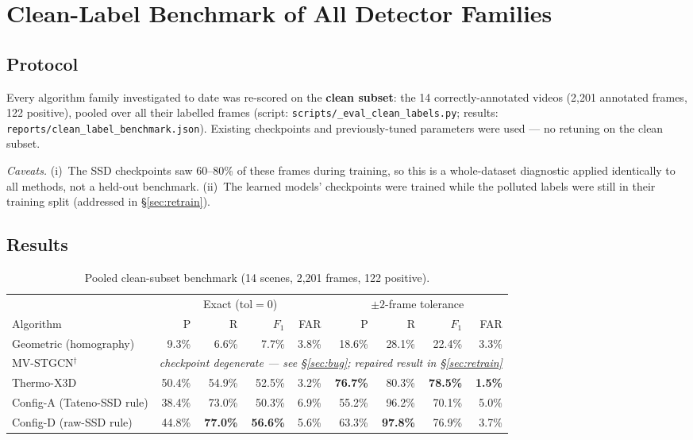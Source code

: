 \documentclass[11pt, a4paper]{article}
\begin{document}
\section{Clean-Label Benchmark of All Detector Families}

\subsection{Protocol}

Every algorithm family investigated to date was re-scored on the \textbf{clean subset}:
the 14 correctly-annotated videos (2{,}201 annotated frames, 122 positive), pooled over
all their labelled frames (script: \texttt{scripts/\_eval\_clean\_labels.py}; results:
\texttt{reports/clean\_label\_benchmark.json}). Existing checkpoints and previously-tuned
parameters were used --- no retuning on the clean subset.

\emph{Caveats.} (i)~The SSD checkpoints saw 60--80\% of these frames during training, so
this is a whole-dataset diagnostic applied identically to all methods, not a held-out
benchmark. (ii)~The learned models' checkpoints were trained while the polluted labels
were still in their training split (addressed in \S\ref{sec:retrain}).

\subsection{Results}

\begin{table}[H]
\centering
\small
\begin{tabular}{lrrrrrrrr}
\toprule
 & \multicolumn{4}{c}{Exact (tol$=0$)} & \multicolumn{4}{c}{$\pm2$-frame tolerance} \\
\cmidrule(lr){2-5}\cmidrule(lr){6-9}
Algorithm & P & R & $F_1$ & FAR & P & R & $F_1$ & FAR \\
\midrule
Geometric (homography)      &  9.3\% &  6.6\% &  7.7\% & 3.8\% & 18.6\% & 28.1\% & 22.4\% & 3.3\% \\
MV-STGCN$^{\dagger}$        & \multicolumn{8}{c}{\emph{checkpoint degenerate --- see \S\ref{sec:bug}; repaired result in \S\ref{sec:retrain}}} \\
Thermo-X3D                  & 50.4\% & 54.9\% & 52.5\% & 3.2\% & \textbf{76.7\%} & 80.3\% & \textbf{78.5\%} & \textbf{1.5\%} \\
Config-A (Tateno-SSD rule)  & 38.4\% & 73.0\% & 50.3\% & 6.9\% & 55.2\% & 96.2\% & 70.1\% & 5.0\% \\
\rowcolor{rowhi}
Config-D (raw-SSD rule)     & 44.8\% & \textbf{77.0\%} & \textbf{56.6\%} & 5.6\% & 63.3\% & \textbf{97.8\%} & 76.9\% & 3.7\% \\
\bottomrule
\end{tabular}
\caption{Pooled clean-subset benchmark (14 scenes, 2{,}201 frames, 122 positive).}
\end{table}
\end{document}
